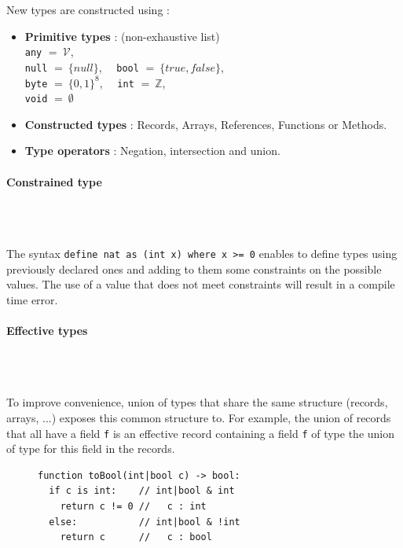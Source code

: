 \documentclass[10pt,a4paper]{article}
\newcommand{\code}{\texttt}
\renewcommand{\indent}{~\\\vspace{-.8cm}}
\newcommand{\pindent}{~\\\indent}
\newcommand{\val}{\mathcal V}
\begin{document}
New types are constructed using :

\begin{itemize}
	\item \textbf{Primitive types} : (non-exhaustive list) \\
	\code {any} $=~\val$,\\
	\code {null} $=~\{null\}$,~~ \code {bool} $=~\{true, false\}$,\\ \code {byte} $=~\{0,1\}^8$,~~ \code {int} $=~\mathbb Z$,\\
	\code {void} $=~\emptyset$
	\item \textbf{Constructed types} : Records, Arrays, References, Functions or Methods.
	\item \textbf{Type operators} : Negation, intersection and union.
\end{itemize}



\paragraph{Constrained type}\pindent

The syntax \lstinline[language=Whiley,basicstyle=\normalsize\ttfamily]{define nat as (int x) where x >= 0}  enables to define types using previously declared ones and adding to them some constraints on the possible values. The use of a value that does not meet constraints will result in a compile time error.





\paragraph{Effective types} \pindent

To improve convenience, union of types that share the same structure (records, arrays, ...) exposes this common structure to. For example, the union of records that all have a field \code f is an effective record containing a field \code f of type the union of type for this field in the records.

\label{EffTypes}


\begin{figure}
	\vspace{-.5cm}
\begin{lstlisting}[language=Whiley]
function toBool(int|bool c) -> bool:
  if c is int:    // int|bool & int
    return c != 0 //   c : int
  else:           // int|bool & !int 
    return c      //   c : bool
\end{lstlisting}
\label{FlowTEC}
\end{figure}
\end{document}
